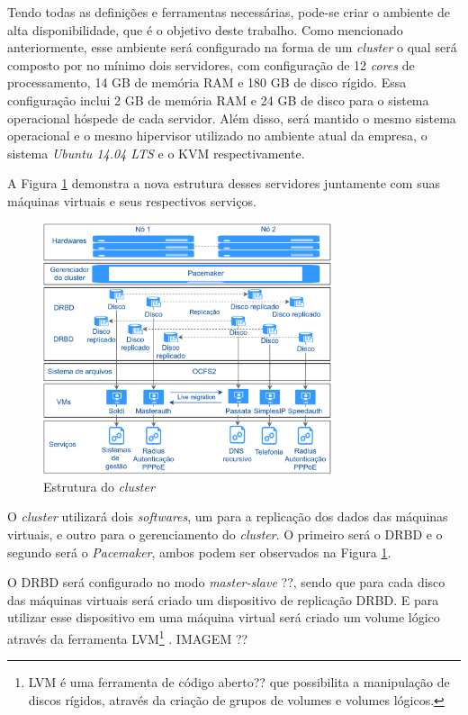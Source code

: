 Tendo todas as definições e ferramentas necessárias, pode-se criar o ambiente de alta disponibilidade, que é o objetivo deste trabalho.
Como mencionado anteriormente, esse ambiente será configurado na forma de um \textit{cluster} o qual será composto por no mínimo dois servidores, 
com configuração de 12 \textit{cores} de processamento, 14 GB de memória \ac{RAM} e 180 GB de disco rígido. Essa configuração inclui
2 GB de memória \ac{RAM} e 24 GB de disco para o sistema operacional hóspede de cada servidor. Além disso, será mantido o mesmo sistema operacional 
e o mesmo hipervisor utilizado no ambiente atual da empresa, o sistema \textit{Ubuntu 14.04 \ac{LTS}} e o \ac{KVM} respectivamente.

A Figura \ref{fig:projeto_estrutura} demonstra a nova estrutura desses servidores juntamente com suas máquinas virtuais e seus respectivos 
serviços.
\begin{figure}[h!]
 \centering
 \includegraphics[width=320px]{img/projeto_estrutura.eps}
 \caption{Estrutura do \textit{cluster}}
 \label{fig:projeto_estrutura}
\end{figure}

O \textit{cluster} utilizará dois \textit{softwares}, um para a replicação dos dados das máquinas virtuais, e outro para o gerenciamento do 
\textit{cluster}. O primeiro será o \ac{DRBD} e o segundo será o \textit{Pacemaker}, ambos podem ser observados na Figura 
\ref{fig:projeto_estrutura}.

O \ac{DRBD} será configurado no modo \textit{master-slave} ??, sendo que para cada disco das máquinas virtuais será criado um dispositivo de 
replicação \ac{DRBD}. E para utilizar esse dispositivo em uma máquina virtual será criado um volume lógico através da ferramenta 
\ac{LVM}\footnote{LVM é uma ferramenta de código aberto?? que possibilita a manipulação de discos rígidos, através da criação de grupos de volumes 
e volumes lógicos.} \cite{lvm}. 
IMAGEM ??


